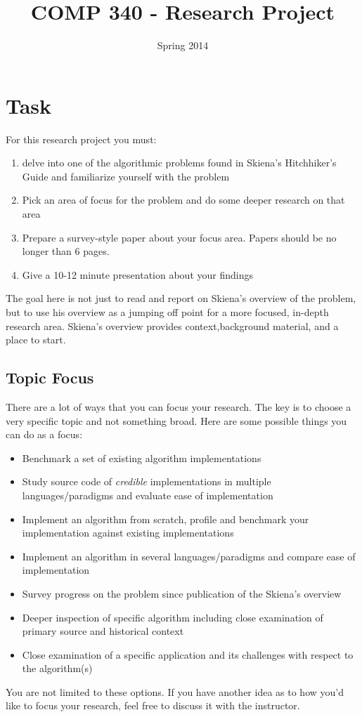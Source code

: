 \documentclass[]{tufte-handout}
\title{COMP 340 - Research Project}
\date{Spring 2014}
\begin{document}
 
\maketitle

\section{Task}

For this research project you must:
\begin{enumerate}
\item delve into one of the algorithmic problems found in Skiena's Hitchhiker's Guide and familiarize yourself with the problem
\item Pick an area of focus for the problem and do some deeper research on that area
\item Prepare a survey-style paper about your focus area. Papers should be no longer than 6 pages. 
\item Give a 10-12 minute presentation about your findings
\end{enumerate}
The goal here is not just to read and report on Skiena's overview of the problem, but to use his overview as a jumping off point for a more focused, in-depth research area.  Skiena's overview provides context,background material, and a place to start.    

\subsection{Topic Focus}

There are a lot of ways that you can focus your research. The key is to choose a very specific topic and not something broad.  Here are some possible things you can do as a focus:
\begin{itemize}
\item Benchmark a set of existing algorithm implementations
\item Study source code of \textit{credible} implementations in multiple languages/paradigms and evaluate ease of implementation
\item Implement an algorithm from scratch, profile and benchmark your implementation against existing implementations
\item Implement an algorithm in several languages/paradigms and compare ease of implementation
\item Survey progress on the problem since publication of the Skiena's overview
\item Deeper inspection of specific algorithm including close examination of primary source and historical context 
\item Close examination of a specific application and its challenges with respect to the algorithm(s)
\end{itemize}
You are not limited to these options. If you have another idea as to how you'd like to focus your research, feel free to discuss it with the instructor. 
\end{document}
